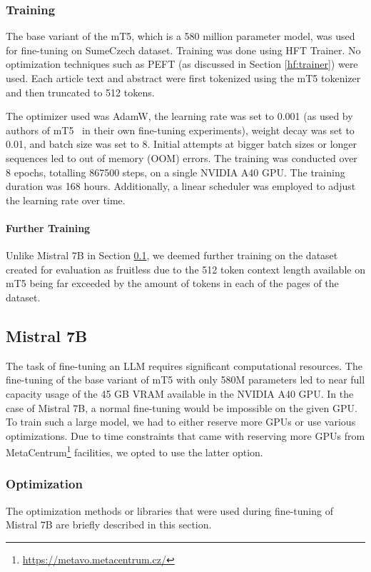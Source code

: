 \documentclass[english, ba, kiv, he, iso690numb, pdf, viewonly]{fasthesis}
\begin{document}
\subsubsection{Training}
The base variant of the mT5, which is a 580 million parameter model, was used for fine-tuning on SumeCzech dataset. Training was done using HFT Trainer. No optimization techniques such as PEFT (as discussed in Section \ref{hf:trainer}) were used. Each article text and abstract were first tokenized using the mT5 tokenizer and then truncated to 512 tokens.

The optimizer used was AdamW, the learning rate was set to 0.001 (as used by authors of mT5~\cite{xue-etal-2021-mt5} in their own fine-tuning experiments), weight decay was set to 0.01, and batch size was set to 8. Initial attempts at bigger batch sizes or longer sequences led to out of memory (OOM) errors. The training was conducted over 8 epochs, totalling 867500 steps, on a single NVIDIA A40 GPU. The training duration was 168 hours. Additionally, a linear scheduler was employed to adjust the learning rate over time.
\paragraph{Further Training}
Unlike Mistral 7B in Section \ref{impl:m7b}, we deemed further training on the dataset created for evaluation as fruitless due to the 512 token context length available on mT5 being far exceeded by the amount of tokens in each of the pages of the dataset.
\subsection{Mistral 7B} \label{impl:m7b}
The task of fine-tuning an LLM requires significant computational resources. The fine-tuning of the base variant of mT5 with only 580M parameters led to near full capacity usage of the 45 GB VRAM available in the NVIDIA A40 GPU. In the case of Mistral 7B, a normal fine-tuning would be impossible on the given GPU. To train such a large model, we had to either reserve more GPUs or use various optimizations. Due to time constraints that came with reserving more GPUs from MetaCentrum\footnote{\url{https://metavo.metacentrum.cz/}} facilities, we opted to use the latter option.
\subsubsection{Optimization}
The optimization methods or libraries that were used during fine-tuning of Mistral 7B are briefly described in this section.
\end{document}
